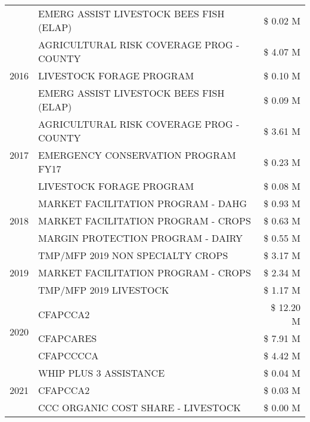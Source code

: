 \begin{tabular}{llr}
 & EMERG ASSIST LIVESTOCK BEES FISH (ELAP) & \$ 0.02 M \\
\cline{1-3}
\multirow[t]{3}{*}{2016} & AGRICULTURAL RISK COVERAGE PROG - COUNTY & \$ 4.07 M \\
 & LIVESTOCK FORAGE PROGRAM & \$ 0.10 M \\
 & EMERG ASSIST LIVESTOCK BEES FISH (ELAP) & \$ 0.09 M \\
\cline{1-3}
\multirow[t]{3}{*}{2017} & AGRICULTURAL RISK COVERAGE PROG - COUNTY & \$ 3.61 M \\
 & EMERGENCY CONSERVATION PROGRAM FY17 & \$ 0.23 M \\
 & LIVESTOCK FORAGE PROGRAM & \$ 0.08 M \\
\cline{1-3}
\multirow[t]{3}{*}{2018} & MARKET FACILITATION PROGRAM - DAHG & \$ 0.93 M \\
 & MARKET FACILITATION PROGRAM - CROPS & \$ 0.63 M \\
 & MARGIN PROTECTION PROGRAM - DAIRY & \$ 0.55 M \\
\cline{1-3}
\multirow[t]{3}{*}{2019} & TMP/MFP 2019 NON SPECIALTY CROPS & \$ 3.17 M \\
 & MARKET FACILITATION PROGRAM - CROPS & \$ 2.34 M \\
 & TMP/MFP 2019 LIVESTOCK & \$ 1.17 M \\
\cline{1-3}
\multirow[t]{3}{*}{2020} & CFAPCCA2 & \$ 12.20 M \\
 & CFAPCARES & \$ 7.91 M \\
 & CFAPCCCCA & \$ 4.42 M \\
\cline{1-3}
\multirow[t]{3}{*}{2021} & WHIP PLUS 3 ASSISTANCE & \$ 0.04 M \\
 & CFAPCCA2 & \$ 0.03 M \\
 & CCC ORGANIC COST SHARE - LIVESTOCK & \$ 0.00 M \\
\cline{1-3}
\bottomrule
\end{tabular}
